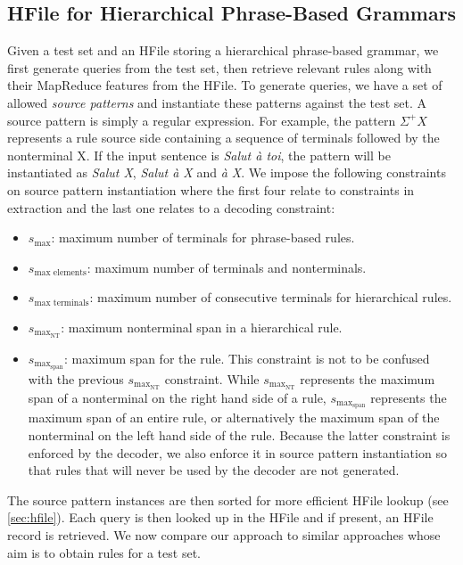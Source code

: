 \subsection{HFile for Hierarchical Phrase-Based Grammars}


Given a test set and an HFile storing a hierarchical phrase-based grammar, we
first generate queries from the test set, then retrieve relevant rules along
with their MapReduce features from the HFile. To generate queries, we have a set
of allowed \emph{source patterns} and instantiate these patterns against the
test set. A source pattern is simply a regular expression. For example, the
pattern $\Sigma^+X$ represents a rule source side containing a sequence of
terminals followed by the nonterminal X. If the input sentence is
\emph{Salut à toi}, the pattern will be instantiated as \emph{Salut X},
\emph{Salut à X} and \emph{à X}. We impose the following constraints on source pattern
instantiation where the first four relate to constraints in extraction and the
last one relates to a decoding constraint:
%
\begin{itemize}
  \item $s_{\text{max}}$: maximum number of terminals for phrase-based rules.
  \item $s_{\text{max elements}}$: maximum number of terminals and nonterminals.
  \item $s_{\text{max terminals}}$: maximum number of consecutive terminals for
    hierarchical rules.
  \item $s_{\text{max}_{\text{NT}}}$: maximum nonterminal span in a hierarchical
    rule.
  \item $s_{\text{max}_{\text{span}}}$: maximum span for the rule. This constraint
    is not to be confused with the previous $s_{\text{max}_{\text{NT}}}$ constraint.
    While $s_{\text{max}_{\text{NT}}}$ represents the maximum span of a nonterminal
    on the right hand side of a rule, $s_{\text{max}_{\text{span}}}$ represents the maximum span
    of an entire rule, or alternatively the maximum span of the nonterminal on the left
    hand side of the rule. Because the latter constraint is enforced by the decoder, we
    also enforce it in source pattern instantiation so that rules that will
    never be used by the decoder are not generated.
\end{itemize}
%
The source pattern instances are then sorted for more efficient HFile lookup
(see \autoref{sec:hfile}). Each query is then looked up in the HFile and if
present, an HFile record is retrieved.
We now compare our approach to similar approaches whose aim is
to obtain rules for a test set.


